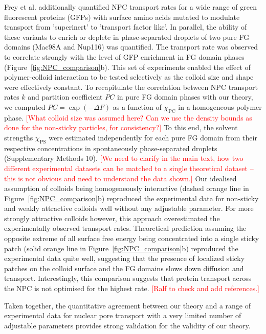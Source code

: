 \documentclass[12pt, a4paper]{article}
\newcommand\todo[1]{\textcolor{red}{#1}}
\begin{document}
Frey et al. \cite{Frey2018} additionally quantified NPC transport rates for a wide range of green fluorescent proteins (GFPs) with surface amino acids mutated to modulate transport from 'superinert' to 'transport factor like'.
In parallel, the ability of these variants to enrich or deplete in phase-separated droplets of two pure FG domains (Mac98A and Nup116) was quantified.
The transport rate was observed to correlate strongly with the level of GFP enrichment in FG domain phases (Figure~\ref{fig:NPC_comparison}b).
This set of experiments enabled the effect of polymer-colloid interaction to be tested selectively as the colloid size and shape were effectively constant.
To recapitulate the correlation between NPC transport rates $k$ and partition coefficient $PC$ in pure FG domain phases with our theory, we computed $PC = \exp(-\Delta F)$ as a function of $\chi_\text{PC}$ in a homogeneous polymer phase.
\todo{[What colloid size was assumed here? Can we use the density bounds as done for the non-sticky particles, for consistency?]}
To this end, the solvent strengths $\chi_\text{PS}$ were estimated independently for each pure FG domain from their respective concentrations in spontaneously phase-separated droplets (Supplementary Methods 10).
\todo{[We need to clarify in the main text, how two different experimental datasets can be matched to a single theoretical dataset -- this is not obvious and need to understand the data shown.]}
Our idealised assumption of colloids being homogeneously interactive (dashed orange line in Figure~\ref{fig:NPC_comparison}b) reproduced the experimental data for non-sticky and weakly attractive colloids well without any adjustable parameter.
For more strongly attractive colloids however, this approach overestimated the experimentally observed transport rates.
Theoretical prediction assuming the opposite extreme of all surface free energy being concentrated into a single sticky patch (solid orange line in Figure~\ref{fig:NPC_comparison}b) reproduced the experimental data quite well, suggesting that the presence of localized sticky patches on the colloid surface and the FG domains slows down diffusion and transport.
Interestingly, this comparison suggests that protein transport across the NPC is not optimised for the highest rate.
\todo{[Ralf to check and add references.]}

Taken together, the quantitative agreement between our theory and a range of experimental data for nuclear pore transport with a very limited number of adjustable parameters provides strong validation for the validity of our theory.
\end{document}

